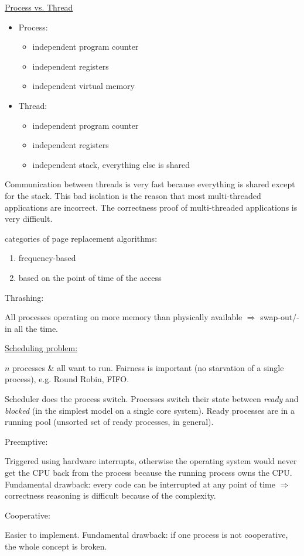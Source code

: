 \par{
	\noindent\underline{Process vs. Thread}
	\parskip0pt\begin{itemize}
		\item{
			Process:
			\parskip0pt\begin{itemize}
				\item{independent program counter}
				\item{independent registers}
				\item{independent virtual memory}
			\end{itemize}
		}
		\item{
			Thread:
			\parskip0pt\begin{itemize}
				\item{independent program counter}
				\item{independent registers}
				\item{independent stack, everything else is shared}
			\end{itemize}
		}
	\end{itemize}
	\par{
		\noindent
		Communication between threads is very fast because everything is shared except for the stack. This bad isolation is the reason that most multi-threaded applications are incorrect. The correctness proof of multi-threaded applications is very difficult.
	}
}
\par{
	 categories of page replacement algorithms:
	\parskip0pt\begin{enumerate}
		\item{frequency-based}
		\item{based on the point of time of the access}
	\end{enumerate}
}
\par{
	\noindent Thrashing:
	\par{
		\noindent
		All processes operating on more memory than physically available $\Rightarrow$ swap-out/-in all the time. 
	}
}
\par{
	\noindent\underline{Scheduling problem:}
	\par{
		\noindent
		$n$ processes \& all want to run. Fairness is important (no starvation of a single process), e.g. Round Robin, FIFO.
	}
	\par{
		\noindent
		Scheduler does the process switch. Processes switch their state between \textit{ready} and \textit{blocked} (in the simplest model on a single core system). Ready processes are in a running pool (unsorted set of ready processes, in general).
	}
	\par{
		\noindent
		Preemptive:
		\par{
			\noindent
			Triggered using hardware interrupts, otherwise the operating system would never get the CPU back from the process because the running process owns the CPU. Fundamental drawback: every code can be interrupted at any point of time $\Rightarrow$ correctness reasoning is difficult because of the complexity.
		}
	}
	\par{
		\noindent
		Cooperative:
		\par{
			\noindent
			Easier to implement. Fundamental drawback: if one process is not cooperative, the whole concept is broken.
		}
	}
}
